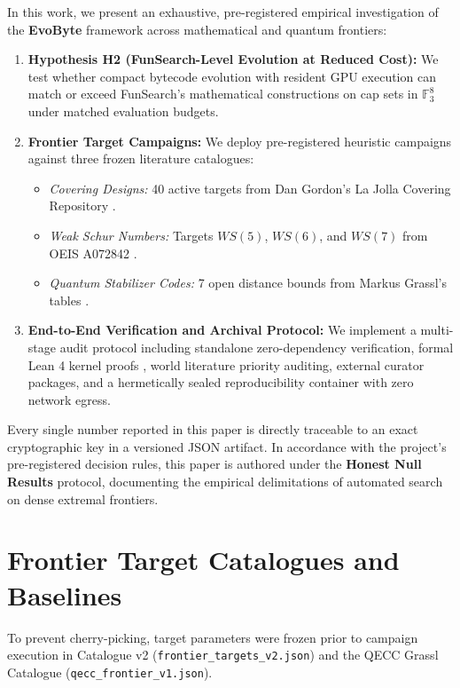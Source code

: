 \documentclass[11pt,a4paper]{article}
\begin{document}
In this work, we present an exhaustive, pre-registered empirical investigation of the \textbf{EvoByte} framework across mathematical and quantum frontiers:
\begin{enumerate}
    \item \textbf{Hypothesis H2 (FunSearch-Level Evolution at Reduced Cost):} We test whether compact bytecode evolution with resident GPU execution can match or exceed FunSearch's mathematical constructions on cap sets in $\mathbb{F}_3^8$ under matched evaluation budgets.
    \item \textbf{Frontier Target Campaigns:} We deploy pre-registered heuristic campaigns against three frozen literature catalogues:
    \begin{itemize}
        \item \emph{Covering Designs:} 40 active targets from Dan Gordon's La Jolla Covering Repository \cite{gordon2026ljcr}.
        \item \emph{Weak Schur Numbers:} Targets $WS(5)$, $WS(6)$, and $WS(7)$ from OEIS A072842 \cite{rowley2025weakschur, rodrigo2026weakschur}.
        \item \emph{Quantum Stabilizer Codes:} 7 open distance bounds from Markus Grassl's tables \cite{grassl2026codetables}.
    \end{itemize}
    \item \textbf{End-to-End Verification and Archival Protocol:} We implement a multi-stage audit protocol including standalone zero-dependency verification, formal Lean 4 kernel proofs \cite{moura2021lean4}, world literature priority auditing, external curator packages, and a hermetically sealed reproducibility container with zero network egress.
\end{enumerate}

Every single number reported in this paper is directly traceable to an exact cryptographic key in a versioned JSON artifact. In accordance with the project's pre-registered decision rules, this paper is authored under the \textbf{Honest Null Results} protocol, documenting the empirical delimitations of automated search on dense extremal frontiers.

\section{Frontier Target Catalogues and Baselines}
\label{sec:catalogues}
To prevent cherry-picking, target parameters were frozen prior to campaign execution in Catalogue v2 (\texttt{frontier\_targets\_v2.json}) and the QECC Grassl Catalogue (\texttt{qecc\_frontier\_v1.json}).
\end{document}
